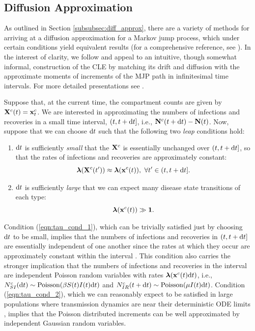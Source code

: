 \subsection{Diffusion Approximation}
\label{subsec:diff_approx}

As outlined in Section \ref{subsubsec:diff_approx}, there are a variety of methods for arriving at a diffusion approximation for a Markov jump process, which under certain conditions yield equivalent results (for a comprehensive reference, see \cite{fuchs2013inference}). In the interest of clarity, we follow \cite{fearnhead2014,golightly2013simulation,golightly2015delayed,wilkinson2011stochastic} and appeal to an intuitive, though somewhat informal, construction of the CLE by matching its drift and diffusion with the approximate moments of increments of the MJP path in infinitesimal time intervals. For more detailed presentations see \cite{fuchs2013inference,gillespie2000chemical,wallace2012linear}. 

Suppose that, at the current time, the compartment counts are given by $ \mathbf{X}^c(t) = \mathbf{x}^c_t $. We are interested in approximating the numbers of infections and recoveries in a small time interval, $ (t, t+\mathrm{d} t] $, i.e., $ \mathbf{N}^c(t+\mathrm{d} t) - \mathbf{N}(t)$. Now, suppose that we can choose $ \mathrm{d} t $ such that the following two \textit{leap} conditions hold:

\begin{enumerate}
	\item $ \mathrm{d} t $ is sufficiently \textit{small} that the $ \mathbf{X}^c $ is essentially unchanged over $ (t,t+\mathrm{d} t] $, so that the rates of infections and recoveries are approximately constant: 
	\begin{equation}\label{eqn:tau_cond_1}
	\boldsymbol{\lambda}(\mathbf{X}^c(t^\prime)) \approx \boldsymbol{\lambda}(\mathbf{x}^c(t)),\ \forall t^\prime \in (t,t+\mathrm{d} t].
	\end{equation}
	\item $ \mathrm{d} t $ is sufficiently \textit{large} that we can expect many disease state transitions of each type:
	\begin{equation}\label{eqn:tau_cond_2}
	\boldsymbol{\lambda}(\mathbf{x}^c(t)) \gg \boldsymbol{1}.
	\end{equation}
\end{enumerate}

Condition (\ref{eqn:tau_cond_1}), which can be trivially satisfied just by choosing $ \mathrm{d} t $ to be small, implies that the numbers of infections and recoveries in $ (t,t+\mathrm{d} t] $ are essentially independent of one another since the rates at which they occur are approximately constant within the interval \cite{gillespie2000chemical}. This condition also carries the stronger implication that the numbers of infections and recoveries in the interval are independent Poisson random variables with rates $ \boldsymbol{\lambda}(\mathbf{x}^c(t)\mathrm{d} t) $, i.e., $ N^c_{SI}(\mathrm{d} t) \sim \mathrm{Poisson}(\beta S(t)I(t)\mathrm{d} t) $ and $ N^c_{IR}(t+\mathrm{d} t) \sim \mathrm{Poisson}(\mu I(t)\mathrm{d} t) $. Condition (\ref{eqn:tau_cond_2}), which we can reasonably expect to be satisfied in large populations where transmission dynamics are near their deterministic ODE limits \cite{wallace2012linear}, implies that the Poisson distributed increments can be well approximated by independent Gaussian random variables. 

